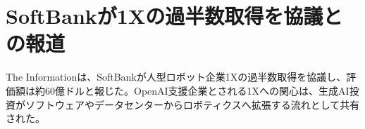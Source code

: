 \section{SoftBankが1Xの過半数取得を協議との報道}
The Informationは、SoftBankが人型ロボット企業1Xの過半数取得を協議し、評価額は約60億ドルと報じた。OpenAI支援企業とされる1Xへの関心は、生成AI投資がソフトウェアやデータセンターからロボティクスへ拡張する流れとして共有された。
